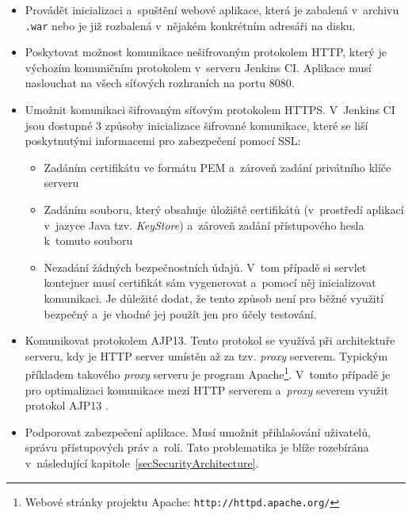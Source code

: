             \begin{itemize}
                \item Provádět inicializaci a~spuštění webové aplikace, která je zabalená v~archivu \texttt{.war}
                    nebo je již rozbalená v~nějakém konkrétním adresáři na disku.
                
                \item Poskytovat možnost komunikace nešifrovaným protokolem HTTP, který je výchozím
                    komuničním protokolem v~serveru Jenkins CI.  Aplikace musí naslouchat na všech síťových rozhraních na portu 8080.
                
                \item Umožnit komunikaci šifrovaným síťovým protokolem HTTPS. V~Jenkins CI jsou dostupné 
                    3 způsoby inicializace šifrované komunikace, které se liší poskytnutými informacemi pro 
                    zabezpečení pomocí SSL:
                    \begin{itemize}
                        \item Zadáním certifikátu ve formátu PEM a~zároveň zadání privátního klíče serveru
                        \item Zadáním souboru, který obsahuje úložiště certifikátů (v~prostředí aplikací v~jazyce Java tzv. \emph{KeyStore}) a~zároveň zadání 
                            přístupového hesla k~tomuto souboru
                        \item Nezadání žádných bezpečnostních údajů. V~tom případě si servlet kontejner musí certifikát sám
                            vygenerovat a~pomocí něj inicializovat komunikaci. Je důležité dodat, že tento způsob
                            není pro běžné využití bezpečný a~je vhodné jej použít jen pro účely testování.
                    \end{itemize} 

                \item Komunikovat protokolem AJP13. Tento protokol se využívá při architektuře serveru,
                    kdy je HTTP server umístěn až za tzv. \emph{proxy} serverem. Typickým příkladem takového
                    \emph{proxy} serveru je program Apache\footnote{Webové stránky projektu Apache: 
                    \texttt{http://httpd.apache.org/}}. V~tomto případě je pro optimalizaci komunikace mezi HTTP serverem
                    a~\emph{proxy} severem využit protokol AJP13 \cite{ajp13Web}.

                \item Podporovat zabezpečení aplikace. Musí umožnit přihlašování uživatelů, správu přístupových práv a~rolí.
                    Tato problematika je blíže rozebírána v~následující kapitole~\ref{secSecurityArchitecture}.
                    

\end{itemize}
